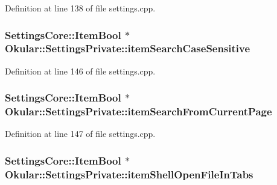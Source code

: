 Definition at line 138 of file settings.\+cpp.

\hypertarget{classOkular_1_1SettingsPrivate_aadab39c61d1860215823fbc1ce76e3b0}{
\subsubsection[{item\+Search\+Case\+Sensitive}]{\setlength{\rightskip}{0pt plus 5cm}Settings\+Core\+::\+Item\+Bool $\ast$ Okular\+::\+Settings\+Private\+::item\+Search\+Case\+Sensitive}}\label{classOkular_1_1SettingsPrivate_aadab39c61d1860215823fbc1ce76e3b0}


Definition at line 146 of file settings.\+cpp.

\hypertarget{classOkular_1_1SettingsPrivate_aa251d7a638d4cd802c4f69c8e70a3bd4}{
\subsubsection[{item\+Search\+From\+Current\+Page}]{\setlength{\rightskip}{0pt plus 5cm}Settings\+Core\+::\+Item\+Bool $\ast$ Okular\+::\+Settings\+Private\+::item\+Search\+From\+Current\+Page}}\label{classOkular_1_1SettingsPrivate_aa251d7a638d4cd802c4f69c8e70a3bd4}


Definition at line 147 of file settings.\+cpp.

\hypertarget{classOkular_1_1SettingsPrivate_a7f0d51eecbcf19e89af1b8fe777873e3}{
\subsubsection[{item\+Shell\+Open\+File\+In\+Tabs}]{\setlength{\rightskip}{0pt plus 5cm}Settings\+Core\+::\+Item\+Bool $\ast$ Okular\+::\+Settings\+Private\+::item\+Shell\+Open\+File\+In\+Tabs}}\label{classOkular_1_1SettingsPrivate_a7f0d51eecbcf19e89af1b8fe777873e3}


